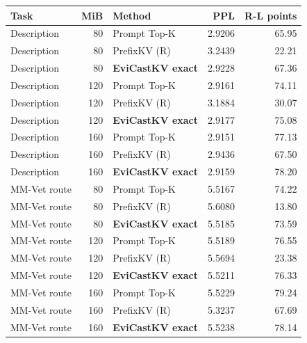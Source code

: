 \begin{tabular}{lr lrr}
\toprule
Task & MiB & Method & PPL & R-L points\\\midrule
Description & 80 & Prompt Top-K & 2.9206 & 65.95\\
Description & 80 & PrefixKV (R) & 3.2439 & 22.21\\
Description & 80 & \textbf{EviCastKV exact} & 2.9228 & 67.36\\
Description & 120 & Prompt Top-K & 2.9161 & 74.11\\
Description & 120 & PrefixKV (R) & 3.1884 & 30.07\\
Description & 120 & \textbf{EviCastKV exact} & 2.9177 & 75.08\\
Description & 160 & Prompt Top-K & 2.9151 & 77.13\\
Description & 160 & PrefixKV (R) & 2.9436 & 67.50\\
Description & 160 & \textbf{EviCastKV exact} & 2.9159 & 78.20\\
MM-Vet route & 80 & Prompt Top-K & 5.5167 & 74.22\\
MM-Vet route & 80 & PrefixKV (R) & 5.6080 & 13.80\\
MM-Vet route & 80 & \textbf{EviCastKV exact} & 5.5185 & 73.59\\
MM-Vet route & 120 & Prompt Top-K & 5.5189 & 76.55\\
MM-Vet route & 120 & PrefixKV (R) & 5.5694 & 23.38\\
MM-Vet route & 120 & \textbf{EviCastKV exact} & 5.5211 & 76.33\\
MM-Vet route & 160 & Prompt Top-K & 5.5229 & 79.24\\
MM-Vet route & 160 & PrefixKV (R) & 5.3237 & 67.69\\
MM-Vet route & 160 & \textbf{EviCastKV exact} & 5.5238 & 78.14\\
\bottomrule
\end{tabular}
